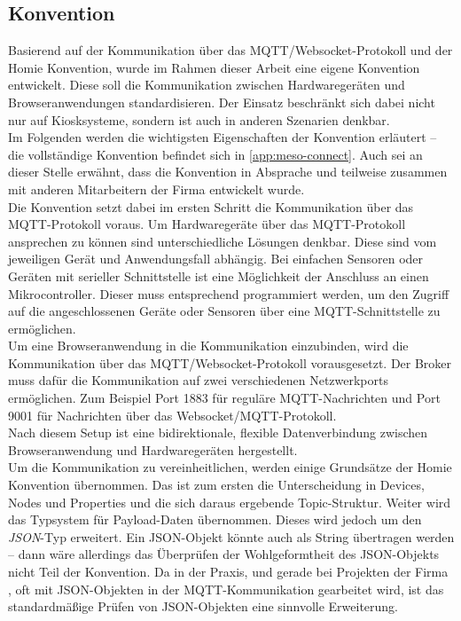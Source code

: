 \subsection{Konvention}
\label{subs:konvention}

Basierend auf der Kommunikation über das MQTT/Websocket-Protokoll und der Homie Konvention,
wurde im Rahmen dieser Arbeit eine eigene Konvention entwickelt. Diese soll die Kommunikation
zwischen Hardwaregeräten und Browseranwendungen standardisieren. Der Einsatz beschränkt
sich dabei nicht nur auf Kiosksysteme, sondern ist auch in anderen Szenarien denkbar.\\
Im Folgenden werden die wichtigsten Eigenschaften der Konvention erläutert -- die vollständige
Konvention befindet sich in \autoref{app:meso-connect}. Auch sei an dieser Stelle erwähnt,
dass die Konvention in Absprache und teilweise zusammen mit anderen Mitarbeitern 
der Firma \meso{} entwickelt wurde.\\

Die Konvention setzt dabei im ersten Schritt die Kommunikation über das MQTT-Protokoll voraus.
Um Hardwaregeräte über das MQTT-Protokoll ansprechen zu können sind unterschiedliche Lösungen 
denkbar. Diese sind vom jeweiligen Gerät und Anwendungsfall abhängig. Bei einfachen Sensoren oder
Geräten mit serieller Schnittstelle ist eine Möglichkeit der Anschluss an einen Mikrocontroller.
Dieser muss entsprechend programmiert werden, um den Zugriff auf die angeschlossenen Geräte 
oder Sensoren über eine MQTT-Schnittstelle zu ermöglichen.\\
Um eine Browseranwendung in die Kommunikation einzubinden, wird die Kommunikation über das 
MQTT/Websocket-Protokoll vorausgesetzt. Der Broker muss dafür die Kommunikation auf zwei verschiedenen 
Netzwerkports ermöglichen. Zum Beispiel Port 1883 für reguläre MQTT-Nachrichten und Port 9001
für Nachrichten über das Websocket/MQTT-Protokoll.\\
Nach diesem Setup ist eine bidirektionale, flexible Datenverbindung zwischen Browseranwendung
und Hardwaregeräten hergestellt.\\

Um die Kommunikation zu vereinheitlichen, werden einige Grundsätze der Homie Konvention übernommen.
Das ist zum ersten die Unterscheidung in Devices, Nodes und Properties und die sich daraus 
ergebende Topic-Struktur. Weiter wird das Typsystem für Payload-Daten übernommen. 
Dieses wird jedoch um den \emph{JSON}-Typ erweitert. 
Ein JSON-Objekt könnte auch als String übertragen werden -- dann wäre allerdings
das Überprüfen der Wohlgeformtheit des JSON-Objekts nicht Teil der Konvention.
Da in der Praxis, und gerade bei Projekten der Firma \meso{}, oft mit JSON-Objekten in der 
MQTT-Kommunikation gearbeitet wird, ist das standardmäßige Prüfen von JSON-Objekten eine
sinnvolle Erweiterung.

